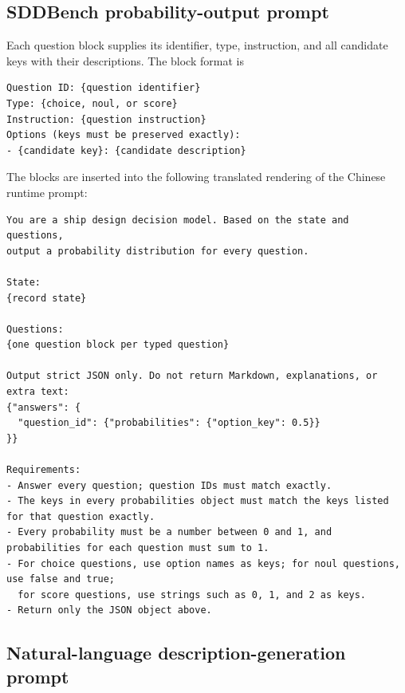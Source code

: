 \documentclass[a4paper,fleqn]{cas-dc}
\begin{document}
\subsection{SDDBench probability-output prompt}
\label{app:benchmark-prompt}

Each question block supplies its identifier, type, instruction, and all candidate
keys with their descriptions. The block format is
\begin{verbatim}
Question ID: {question identifier}
Type: {choice, noul, or score}
Instruction: {question instruction}
Options (keys must be preserved exactly):
- {candidate key}: {candidate description}
\end{verbatim}
The blocks are inserted into the following translated rendering of the Chinese
runtime prompt:

\begingroup
\small
\begin{verbatim}
You are a ship design decision model. Based on the state and questions,
output a probability distribution for every question.

State:
{record state}

Questions:
{one question block per typed question}

Output strict JSON only. Do not return Markdown, explanations, or extra text:
{"answers": {
  "question_id": {"probabilities": {"option_key": 0.5}}
}}

Requirements:
- Answer every question; question IDs must match exactly.
- The keys in every probabilities object must match the keys listed for that question exactly.
- Every probability must be a number between 0 and 1, and probabilities for each question must sum to 1.
- For choice questions, use option names as keys; for noul questions, use false and true;
  for score questions, use strings such as 0, 1, and 2 as keys.
- Return only the JSON object above.
\end{verbatim}
\endgroup

\subsection{Natural-language description-generation prompt}
\label{app:description-prompt}
\end{document}
